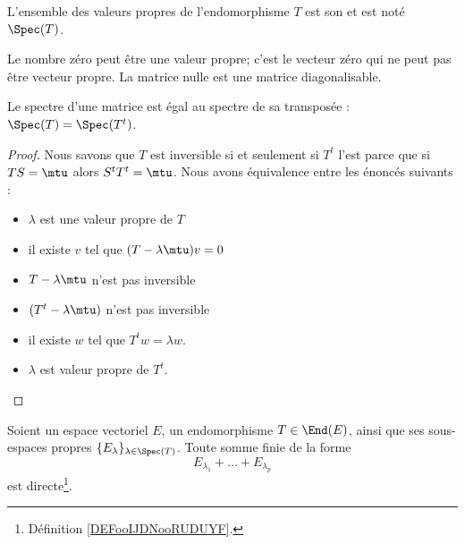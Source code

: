 \begin{definition}
	L'ensemble des valeurs propres de l'endomorphisme \( T\) est son  et est noté \( \Spec(T)\).
\end{definition}

\begin{remark}
	Le nombre zéro peut être une valeur propre; c'est le vecteur zéro qui ne peut pas être vecteur propre. La matrice nulle est une matrice diagonalisable.
\end{remark}

\begin{lemma}     \label{LEMooWHWUooFFXlzT}
	Le spectre d'une matrice est égal au spectre de sa transposée : \( \Spec(T)=\Spec(T^t)\).
\end{lemma}

\begin{proof}
	Nous savons que \( T\) est inversible si et seulement si \( T^t\) l'est parce que si \( TS=\mtu\) alors \( S^tT^t=\mtu\). Nous avons équivalence entre les énoncés suivants :
	\begin{itemize}
		\item \( \lambda\) est une valeur propre de \( T\)
		\item
		      il existe \( v\) tel que \( (T-\lambda\mtu)v=0\)
		\item
		      \( T-\lambda\mtu\) n'est pas inversible
		\item
		      \( (T^t-\lambda\mtu)\) n'est pas inversible
		\item
		      il existe \( w\) tel que \( T^tw=\lambda w\).
		\item
		      \( \lambda\) est valeur propre de \( T^t\).
	\end{itemize}
\end{proof}

\begin{lemma}       \label{LemjcztYH}
	Soient un espace vectoriel \( E\), un endomorphisme \( T\in \End(E)\), ainsi que ses sous-espaces propres \( \{ E_{\lambda} \}_{\lambda\in \Spec(T)}  \). Toute somme finie de la forme
	\begin{equation}
		E_{\lambda_1}+\ldots+E_{\lambda_p}
	\end{equation}
	est directe\footnote{Définition \ref{DEFooIJDNooRUDUYF}.}.
\end{lemma}

